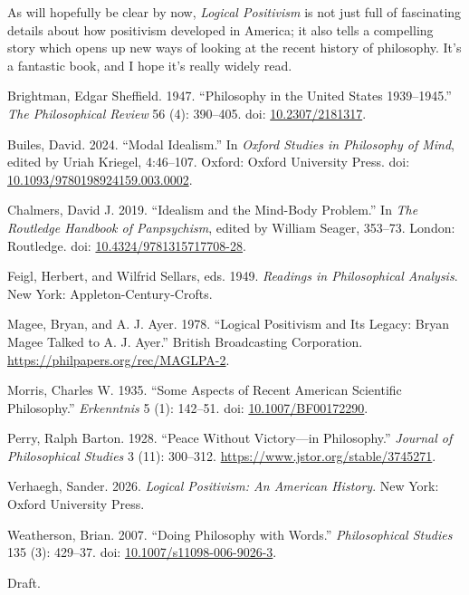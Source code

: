 \documentclass[
  11pt,
  letterpaper,
  DIV=11,
  numbers=noendperiod,
  twoside]{scrartcl}
\newlength{\cslhangindent}
\newenvironment{CSLReferences}[2] %
 {\begin{list}{}{%
  \setlength{\itemindent}{0pt}
  \setlength{\leftmargin}{0pt}
  \setlength{\parsep}{0pt}
  \ifodd #1
   \setlength{\leftmargin}{\cslhangindent}
   \setlength{\itemindent}{-1\cslhangindent}
  \fi
  \setlength{\itemsep}{#2\baselineskip}}}
 {\end{list}}
\begin{document}
As will hopefully be clear by now, \emph{Logical Positivism} is not just
full of fascinating details about how positivism developed in America;
it also tells a compelling story which opens up new ways of looking at
the recent history of philosophy. It's a fantastic book, and I hope it's
really widely read.

\protect{}\label{refs}
\begin{CSLReferences}{1}{0}
Brightman, Edgar Sheffield. 1947. {``Philosophy in the {United States}
1939--1945.''} \emph{The Philosophical Review} 56 (4): 390--405. doi:
\href{https://doi.org/10.2307/2181317}{10.2307/2181317}.

Builes, David. 2024. {``Modal Idealism.''} In \emph{Oxford Studies in
Philosophy of Mind}, edited by Uriah Kriegel, 4:46--107. Oxford: Oxford
University Press. doi:
\href{https://doi.org/10.1093/9780198924159.003.0002}{10.1093/9780198924159.003.0002}.

Chalmers, David J. 2019. {``Idealism and the Mind-Body Problem.''} In
\emph{The {Routledge} Handbook of Panpsychism}, edited by William
Seager, 353--73. London: Routledge. doi:
\href{https://doi.org/10.4324/9781315717708-28}{10.4324/9781315717708-28}.

Feigl, Herbert, and Wilfrid Sellars, eds. 1949. \emph{Readings in
Philosophical Analysis}. New York: Appleton-Century-Crofts.

Magee, Bryan, and A. J. Ayer. 1978. {``Logical Positivism and Its
Legacy: {Bryan Magee} Talked to {A. J. Ayer}.''} British Broadcasting
Corporation. \url{https://philpapers.org/rec/MAGLPA-2}.

Morris, Charles W. 1935. {``Some Aspects of Recent American Scientific
Philosophy.''} \emph{Erkenntnis} 5 (1): 142--51. doi:
\href{https://doi.org/10.1007/BF00172290}{10.1007/BF00172290}.

Perry, Ralph Barton. 1928. {``Peace Without Victory---in Philosophy.''}
\emph{Journal of Philosophical Studies} 3 (11): 300--312.
\url{https://www.jstor.org/stable/3745271}.

Verhaegh, Sander. 2026. \emph{Logical Positivism: An American History}.
New York: Oxford University Press.

Weatherson, Brian. 2007. {``{Doing Philosophy with Words}.''}
\emph{Philosophical Studies} 135 (3): 429--37. doi:
\href{https://doi.org/10.1007/s11098-006-9026-3}{10.1007/s11098-006-9026-3}.

\end{CSLReferences}



\vspace{12pt} \noindent Draft.
\end{document}
